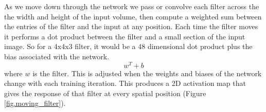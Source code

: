 

As we move down through the network we pass or convolve each filter across the the width and height of the input volume, then compute a weighted sum between the entries of the filter and the input at any position. Each time the filter moves it performs a dot product between the filter and a small section of the input image. So for a 4x4x3 filter, it would be a 48 dimensional dot product plus the bias associated with the network. 
\[ w^T + b \] where $w$ is the filter.
This is adjusted when the weights and biases of the network change with each training iteration. This produces a 2D activation map that gives the response of that filter at every spatial position (Figure \ref{fig.moving_filter}). 
 

